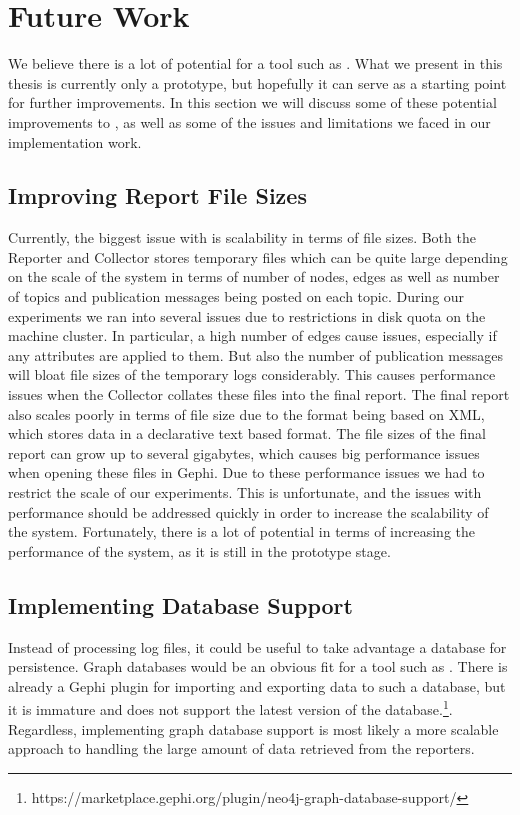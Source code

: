 \section{Future Work}

We believe there is a lot of potential for a tool such as \demo{}. What
we present in this thesis is currently only a prototype, but hopefully
it can serve as a starting point for further improvements. In this
section we will discuss some of these potential improvements to \demo{},
as well as some of the issues and limitations we faced in our implementation work.

\subsection{Improving Report File Sizes}

Currently, the biggest issue with \demo{} is scalability in terms of
file sizes. Both the Reporter and Collector stores temporary files
which can be quite large depending on the scale of the system in terms
of number of nodes, edges as well as number of topics and publication
messages being posted on each topic. During our experiments we ran into
several issues due to restrictions in disk quota on the machine cluster.
In particular, a high number of edges cause issues, especially if any
attributes are applied to them. But also the number of publication
messages will bloat file sizes of the temporary logs considerably. This
causes performance issues when the Collector collates these files into
the final report. The final report also scales poorly in terms of file
size due to the \gexf{} format being based on XML, which stores data in
a declarative text based format. The file sizes of the final report can
grow up to several gigabytes, which causes big performance issues when
opening these files in Gephi. Due to these performance issues we had to
restrict the scale of our experiments. This is unfortunate, and the
issues with performance should be addressed quickly in order to increase
the scalability of the system. Fortunately, there is a lot of
potential in terms of increasing the performance of the system,
as it is still in the prototype stage.

\subsection{Implementing Database Support}

Instead of processing log files, it could be useful to take advantage a
database for persistence. Graph databases would be an obvious fit for a
tool such as \demo{}. There is already a Gephi plugin for importing and
exporting data to such a database, but it is immature and does not
support the latest version of the
database.\footnote{https://marketplace.gephi.org/plugin/neo4j-graph-database-support/}.
Regardless, implementing graph database support is most likely a more
scalable approach to handling the large amount of data retrieved from
the reporters.

